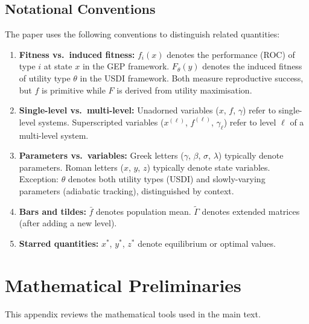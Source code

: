 \documentclass[12pt]{article}
\begin{document}
\subsection{Notational Conventions}

The paper uses the following conventions to distinguish related quantities:

\begin{enumerate}
    \item \textbf{Fitness vs.\ induced fitness:} $f_i(x)$ denotes the performance (ROC) of type $i$ at state $x$ in the GEP framework. $F_\theta(y)$ denotes the induced fitness of utility type $\theta$ in the USDI framework. Both measure reproductive success, but $f$ is primitive while $F$ is derived from utility maximisation.
    
    \item \textbf{Single-level vs.\ multi-level:} Unadorned variables ($x$, $f$, $\gamma$) refer to single-level systems. Superscripted variables ($x^{(\ell)}$, $f^{(\ell)}$, $\gamma_\ell$) refer to level $\ell$ of a multi-level system.
    
    \item \textbf{Parameters vs.\ variables:} Greek letters ($\gamma$, $\beta$, $\sigma$, $\lambda$) typically denote parameters. Roman letters ($x$, $y$, $z$) typically denote state variables. Exception: $\theta$ denotes both utility types (USDI) and slowly-varying parameters (adiabatic tracking), distinguished by context.
    
    \item \textbf{Bars and tildes:} $\bar{f}$ denotes population mean. $\tilde{\Gamma}$ denotes extended matrices (after adding a new level).
    
    \item \textbf{Starred quantities:} $x^*$, $y^*$, $z^*$ denote equilibrium or optimal values.
\end{enumerate}


\section{Mathematical Preliminaries}
\label{app:preliminaries}

This appendix reviews the mathematical tools used in the main text.
\end{document}
